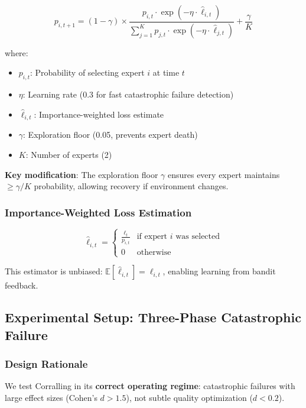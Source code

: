 \begin{equation}
p_{i,t+1} = (1-\gamma) \times \frac{p_{i,t} \cdot \exp(-\eta \cdot \hat{\ell}_{i,t})}{\sum_{j=1}^{K} p_{j,t} \cdot \exp(-\eta \cdot \hat{\ell}_{j,t})} + \frac{\gamma}{K}
\label{eq:corralling_mixed}
\end{equation}

where:
\begin{itemize}
    \item $p_{i,t}$: Probability of selecting expert $i$ at time $t$
    \item $\eta$: Learning rate (0.3 for fast catastrophic failure detection)
    \item $\hat{\ell}_{i,t}$: Importance-weighted loss estimate
    \item $\gamma$: Exploration floor (0.05, prevents expert death)
    \item $K$: Number of experts (2)
\end{itemize}

\textbf{Key modification}: The exploration floor $\gamma$ ensures every expert maintains $\geq \gamma/K$ probability, allowing recovery if environment changes.

\subsubsection{Importance-Weighted Loss Estimation}

\begin{equation}
\hat{\ell}_{i,t} = \begin{cases}
\frac{\ell_t}{p_{i,t}} & \text{if expert } i \text{ was selected} \\
0 & \text{otherwise}
\end{cases}
\label{eq:importance_weight}
\end{equation}

This estimator is unbiased: $\mathbb{E}[\hat{\ell}_{i,t}] = \ell_{i,t}$, enabling learning from bandit feedback.

\subsection{Experimental Setup: Three-Phase Catastrophic Failure}

\subsubsection{Design Rationale}

We test Corralling in its \textbf{correct operating regime}: catastrophic failures with large effect sizes (Cohen's $d > 1.5$), not subtle quality optimization ($d < 0.2$).

